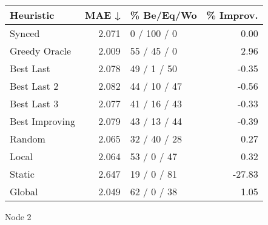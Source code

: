 \begin{tabular}{lrlr}
\toprule
\textbf{Heuristic} & \textbf{MAE ↓} & \textbf{\% Be/Eq/Wo} & \textbf{\% Improv.} \\
\midrule
            Synced &          2.071 &          0 / 100 / 0 &                0.00 \\
     Greedy Oracle &          2.009 &          55 / 45 / 0 &                2.96 \\
         Best Last &          2.078 &          49 / 1 / 50 &               -0.35 \\
       Best Last 2 &          2.082 &         44 / 10 / 47 &               -0.56 \\
       Best Last 3 &          2.077 &         41 / 16 / 43 &               -0.33 \\
    Best Improving &          2.079 &         43 / 13 / 44 &               -0.39 \\
            Random &          2.065 &         32 / 40 / 28 &                0.27 \\
             Local &          2.064 &          53 / 0 / 47 &                0.32 \\
            Static &          2.647 &          19 / 0 / 81 &              -27.83 \\
            Global &          2.049 &          62 / 0 / 38 &                1.05 \\
\bottomrule
\end{tabular}
\caption{Node 2}
\label{tab:hr_non_lr01_le2_bs2_2}
